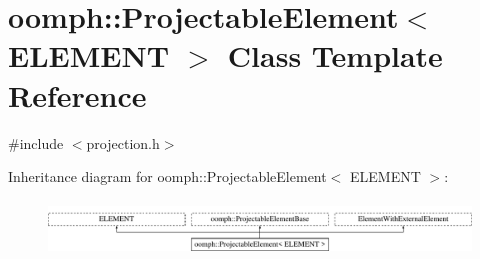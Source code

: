 \hypertarget{classoomph_1_1ProjectableElement}{}\section{oomph\+:\+:Projectable\+Element$<$ E\+L\+E\+M\+E\+NT $>$ Class Template Reference}
\label{classoomph_1_1ProjectableElement}


{\ttfamily \#include $<$projection.\+h$>$}

Inheritance diagram for oomph\+:\+:Projectable\+Element$<$ E\+L\+E\+M\+E\+NT $>$\+:\begin{figure}[H]
\begin{center}
\leavevmode
\includegraphics[height=1.475626cm]{classoomph_1_1ProjectableElement}
\end{center}
\end{figure}
